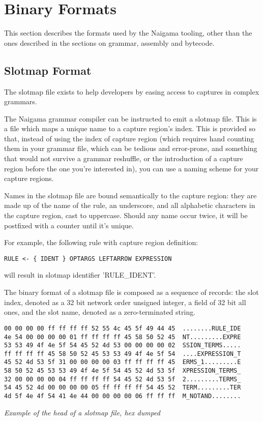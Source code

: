 \section{Binary Formats}

This section describes the formats used by the Naigama tooling, other than
the ones described in the sections on grammar, assembly and bytecode.

\subsection{Slotmap Format}

The slotmap file exists to help developers by easing access to
captures in complex grammars.

The Naigama grammar compiler can be instructed to emit a slotmap file.
This is a file which maps a unique name to a capture region's index.
This is provided so that, instead of using the index of capture region
(which requires hand counting them in your grammar file, which can be
tedious and error-prone, and something that would not survive
a grammar reshuffle, or the introduction of a capture region before
the one you're interested in), you can use a naming scheme for your
capture regions.

Names in the slotmap file are bound semantically to the capture region:
they are made up of the name of the rule,
an underscore, and all alphabetic characters in the capture region,
cast to uppercase. Should any name occur twice, it will be postfixed with
a counter until it's unique.

For example, the following rule with capture region definition:

\begin{myquote}
\begin{verbatim}
RULE <- { IDENT } OPTARGS LEFTARROW EXPRESSION
\end{verbatim}
\end{myquote}

will result in slotmap identifier 'RULE\_IDENT'.

The binary format of a slotmap file is composed as a sequence of records:
the slot index, denoted as a 32 bit network order unsigned integer, a
field of 32 bit all ones, and the slot name, denoted as a zero-terminated
string.

\begin{myquote}
\begin{verbatim}
00 00 00 00 ff ff ff ff 52 55 4c 45 5f 49 44 45  ........RULE_IDE
4e 54 00 00 00 00 01 ff ff ff ff 45 58 50 52 45  NT.........EXPRE
53 53 49 4f 4e 5f 54 45 52 4d 53 00 00 00 00 02  SSION_TERMS.....
ff ff ff ff 45 58 50 52 45 53 53 49 4f 4e 5f 54  ....EXPRESSION_T
45 52 4d 53 5f 31 00 00 00 00 03 ff ff ff ff 45  ERMS_1.........E
58 50 52 45 53 53 49 4f 4e 5f 54 45 52 4d 53 5f  XPRESSION_TERMS_
32 00 00 00 00 04 ff ff ff ff 54 45 52 4d 53 5f  2.........TERMS_
54 45 52 4d 00 00 00 00 05 ff ff ff ff 54 45 52  TERM.........TER
4d 5f 4e 4f 54 41 4e 44 00 00 00 00 06 ff ff ff  M_NOTAND........

\end{verbatim}
\end{myquote}
\textit{Example of the head of a slotmap file, hex dumped}

